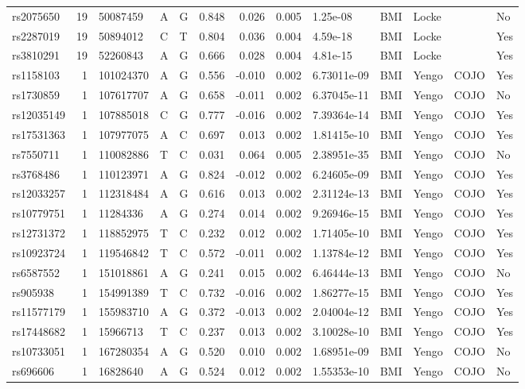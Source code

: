 \documentclass[11pt,twoside]{bristolthesis}
\begin{document}
\begin{longtable}[t]{lrlllrrrlllll}
rs2075650 & 19 & 50087459 & A & G & 0.848 & 0.026 & 0.005 & 1.25e-08 & BMI & Locke &  & No\\
rs2287019 & 19 & 50894012 & C & T & 0.804 & 0.036 & 0.004 & 4.59e-18 & BMI & Locke &  & Yes\\
rs3810291 & 19 & 52260843 & A & G & 0.666 & 0.028 & 0.004 & 4.81e-15 & BMI & Locke &  & Yes\\
\addlinespace
rs1158103 & 1 & 101024370 & A & G & 0.556 & -0.010 & 0.002 & 6.73011e-09 & BMI & Yengo & COJO & Yes\\
rs1730859 & 1 & 107617707 & A & G & 0.658 & -0.011 & 0.002 & 6.37045e-11 & BMI & Yengo & COJO & No\\
rs12035149 & 1 & 107885018 & C & G & 0.777 & -0.016 & 0.002 & 7.39364e-14 & BMI & Yengo & COJO & Yes\\
rs17531363 & 1 & 107977075 & A & C & 0.697 & 0.013 & 0.002 & 1.81415e-10 & BMI & Yengo & COJO & Yes\\
rs7550711 & 1 & 110082886 & T & C & 0.031 & 0.064 & 0.005 & 2.38951e-35 & BMI & Yengo & COJO & No\\
\addlinespace
rs3768486 & 1 & 110123971 & A & G & 0.824 & -0.012 & 0.002 & 6.24605e-09 & BMI & Yengo & COJO & Yes\\
rs12033257 & 1 & 112318484 & A & G & 0.616 & 0.013 & 0.002 & 2.31124e-13 & BMI & Yengo & COJO & Yes\\
rs10779751 & 1 & 11284336 & A & G & 0.274 & 0.014 & 0.002 & 9.26946e-15 & BMI & Yengo & COJO & Yes\\
rs12731372 & 1 & 118852975 & T & C & 0.232 & 0.012 & 0.002 & 1.71405e-10 & BMI & Yengo & COJO & Yes\\
rs10923724 & 1 & 119546842 & T & C & 0.572 & -0.011 & 0.002 & 1.13784e-12 & BMI & Yengo & COJO & Yes\\
\addlinespace
rs6587552 & 1 & 151018861 & A & G & 0.241 & 0.015 & 0.002 & 6.46444e-13 & BMI & Yengo & COJO & No\\
rs905938 & 1 & 154991389 & T & C & 0.732 & -0.016 & 0.002 & 1.86277e-15 & BMI & Yengo & COJO & Yes\\
rs11577179 & 1 & 155983710 & A & G & 0.372 & -0.013 & 0.002 & 2.04004e-12 & BMI & Yengo & COJO & Yes\\
rs17448682 & 1 & 15966713 & T & C & 0.237 & 0.013 & 0.002 & 3.10028e-10 & BMI & Yengo & COJO & Yes\\
rs10733051 & 1 & 167280354 & A & G & 0.520 & 0.010 & 0.002 & 1.68951e-09 & BMI & Yengo & COJO & No\\
\addlinespace
rs696606 & 1 & 16828640 & A & G & 0.524 & 0.012 & 0.002 & 1.55353e-10 & BMI & Yengo & COJO & No\\

\end{longtable}
\end{document}
